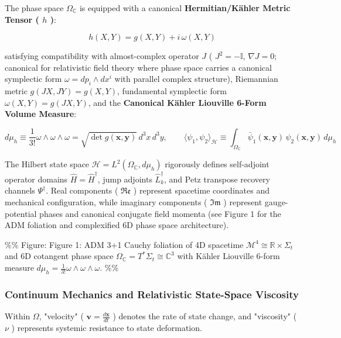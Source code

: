 \documentclass[11pt,a4paper]{article}
\theoremstyle{definition}\newtheorem{definition}{Definition}
\theoremstyle{remark}\newtheorem{remark}{Remark}
\begin{document}
The phase space $\Omega_{\mathbb{C}}$ is equipped with a canonical \textbf{Hermitian/Kähler Metric Tensor ( $h$ )}:


\begin{equation}
h(X, Y) = g(X, Y) + i \, \omega(X, Y)
\end{equation}


satisfying compatibility with almost-complex operator $J$ ( $J^2 = -\mathbb{I}$, $\nabla J = 0$; canonical for relativistic field theory where phase space carries a canonical symplectic form $\omega = dp_i \wedge dx^i$ with parallel complex structure), Riemannian metric $g(JX, JY) = g(X, Y)$, fundamental symplectic form $\omega(X, Y) = g(JX, Y)$, and the \textbf{Canonical Kähler Liouville 6-Form Volume Measure}:


\begin{equation}
\boxed{d\mu_h \equiv \frac{1}{3!} \omega \wedge \omega \wedge \omega = \sqrt{\det g(\mathbf{x}, \mathbf{y})} \, d^3x \, d^3y, \qquad \langle \psi_1, \psi_2 \rangle_{\mathcal{H}} \equiv \int_{\Omega_{\mathbb{C}}} \bar{\psi}_1(\mathbf{x}, \mathbf{y}) \, \psi_2(\mathbf{x}, \mathbf{y}) \, d\mu_h}
\end{equation}


The Hilbert state space $\mathcal{H} = L^2(\Omega_{\mathbb{C}}, d\mu_h)$ rigorously defines self-adjoint operator domains $\hat{H} = \hat{H}^\dagger$, jump adjoints $\hat{L}_k^\dagger$, and Petz transpose recovery channels $\Psi^\dagger$. Real components ( $\mathfrak{Re}$ ) represent spacetime coordinates and mechanical configuration, while imaginary components ( $\mathfrak{Im}$ ) represent gauge-potential phases and canonical conjugate field momenta (see Figure 1 for the ADM foliation and complexified 6D phase space architecture).

\%\% Figure: Figure 1: ADM 3+1 Cauchy foliation of 4D spacetime $\mathcal{M}^4 \cong \mathbb{R} \times \Sigma_t$ and 6D cotangent phase space $\Omega_{\mathbb{C}} = T^*\Sigma_t \cong \mathbb{C}^3$ with Kähler Liouville 6-form measure $d\mu_h = \frac{1}{3!}\omega \wedge \omega \wedge \omega$. \%\%
\subsubsection{Continuum Mechanics and Relativistic State-Space Viscosity}

Within $\Omega$, "velocity" ( $\mathbf{v} = \frac{d\mathbf{x}}{dt}$ ) denotes the rate of state change, and "viscosity" ( $\nu$ ) represents systemic resistance to state deformation.
\end{document}
